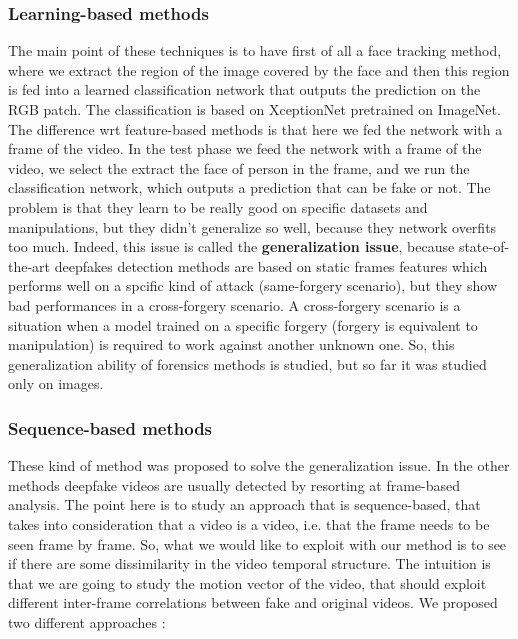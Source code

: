\documentclass[11pt]{article}
\begin{document}
\subsubsection{Learning-based methods}
The main point of these techniques is to have first of all a face tracking method, where we extract the region of the image covered by the face and then this region is fed into a learned classification network that outputs the prediction on the RGB patch. The classification is based on XceptionNet pretrained on ImageNet. The difference wrt feature-based methods is that here we fed the network with a frame of the video. In the test phase we feed the network with a frame of the video, we select the extract the face of person in the frame, and we run the classification network, which outputs a prediction that can be fake or not. The problem is that they learn to be really good on specific datasets and manipulations, but they didn't generalize so well, because they network overfits too much. Indeed, this issue is called the \textbf{generalization issue}, because state-of-the-art deepfakes detection methods are based on static frames features which performs well on a spcific kind of attack (same-forgery scenario), but they show bad performances in a cross-forgery scenario. A cross-forgery scenario is a situation when a model trained on a specific forgery (forgery is equivalent to manipulation) is required to work against another unknown one. So, this generalization ability of forensics methods is studied, but so far it was studied only on images.

\subsubsection{Sequence-based methods}
These kind of method was proposed to solve the generalization issue. In the other methods deepfake videos are usually detected by resorting at frame-based analysis. The point here is to study an approach that is sequence-based, that takes into consideration that a video is a video, i.e. that the frame needs to be seen frame by frame. So, what we would like to exploit with our method is to see if there are some dissimilarity in the video temporal structure. The intuition is that we are going to study the motion vector of the video, that should exploit different inter-frame correlations between fake and original videos. We proposed two different approaches : 
\end{document}
